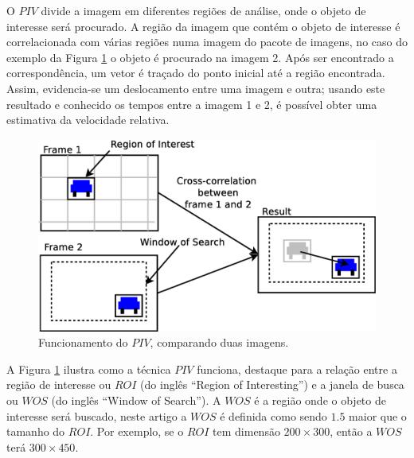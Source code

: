 O $PIV$ divide a imagem em diferentes regiões de análise, onde o objeto de interesse será procurado. 
A região da imagem que contém o objeto de interesse é correlacionada 
com várias regiões numa imagem do pacote de imagens, no caso do exemplo da 
Figura \ref{fig:twoframes} o objeto é procurado na imagem 2. 
Após ser encontrado a correspondência, um vetor é traçado do ponto inicial
até a região encontrada. Assim, evidencia-se um deslocamento entre uma imagem e outra; usando este resultado
e conhecido os tempos entre a imagem 1 e 2,
é possível obter uma  estimativa da velocidade relativa.

\begin{figure}[H]
\includegraphics[width=\columnwidth]{images/explanationPIV.eps}
\caption{Funcionamento do $PIV$, comparando duas imagens.}
\label{fig:twoframes}
\end{figure}

A Figura \ref{fig:twoframes} ilustra como a técnica $PIV$ funciona, 
destaque para a relação entre a região de interesse ou $ROI$ (do inglês ``Region of Interesting'') e 
a janela de busca ou $WOS$  (do inglês ``Window of Search''). 
A $WOS$ é a região onde o objeto de interesse será buscado,
neste artigo a $WOS$ é definida como sendo $1.5$ maior que o tamanho do $ROI$. 
Por exemplo, se o $ROI$ tem dimensão $200\times300$, então a $WOS$ terá $300\times450$.


